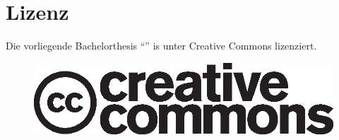 \chapter*{Lizenz}

Die vorliegende Bachelorthesis \enquote{\thesisTitle{}} is unter Creative Commons  lizenziert.
\vspace{0.5\textheight}
\begin{figure}[h]
    \begin{center}
        \includegraphics[width=0.5\linewidth]{resources/cc_logo}
    \end{center}
    \label{fig:cc_logo}
\end{figure}
